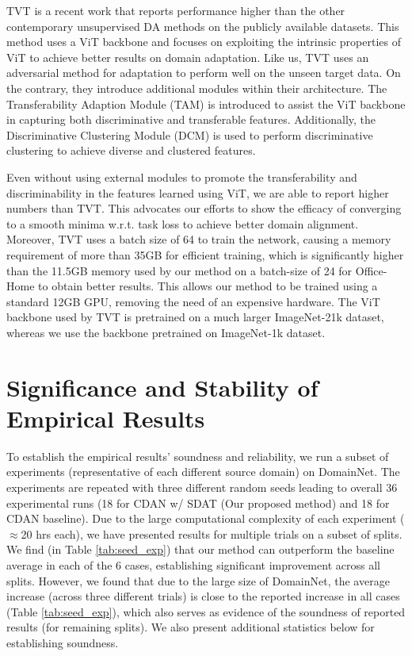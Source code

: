 \documentclass[table,dvipsnames]{article}
\theoremstyle{plain}
\theoremstyle{definition}
\theoremstyle{remark}
\begin{document}
TVT \cite{yang2021tvt} is a recent work that reports performance higher than the other contemporary unsupervised DA methods on the publicly available datasets. This method uses a ViT backbone and focuses on exploiting the intrinsic properties of ViT to achieve better results on domain adaptation. 
Like us, TVT uses an adversarial method for adaptation to perform well on the unseen target data. On the contrary, they introduce additional modules within their architecture. The Transferability Adaption Module (TAM) is introduced to assist the ViT backbone in capturing both discriminative and transferable features. Additionally, the Discriminative Clustering Module (DCM) is used to perform discriminative clustering to achieve diverse and clustered features. 

Even without using external modules to promote the transferability and discriminability in the features learned using ViT, we are able to report higher numbers than TVT. This advocates our efforts to show the efficacy of converging to a smooth minima w.r.t. task loss to achieve better domain alignment. Moreover, TVT uses a batch size of 64 to train the network, causing a memory requirement of more than 35GB for efficient training, which is significantly higher than the 11.5GB memory used by our method on a batch-size of 24 for Office-Home to obtain better results. This allows our method to be trained using a standard 12GB GPU, removing the need of an expensive hardware. The ViT backbone used by TVT is pretrained on a much larger ImageNet-21k dataset, whereas we use the backbone pretrained on ImageNet-1k dataset.   

\section{
{Significance and Stability of Empirical Results}}
\label{app:stats_sig}
To establish the empirical results' soundness and reliability, we run a subset of experiments (representative of each different source domain) on DomainNet. The experiments are repeated with three different random seeds leading to overall 36 experimental runs (18 for CDAN w/ SDAT (Our proposed method) and 18 for CDAN baseline). 
Due to the large computational complexity of each experiment ($\approx$20 hrs each), we have presented results for multiple trials on a subset of splits. We find (in Table \ref{tab:seed_exp}) that our method can outperform the baseline average in each of the 6 cases, establishing significant improvement across all splits. However, we found that due to the large size of DomainNet, the average increase (across three different trials) is close to the reported increase in all cases (Table \ref{tab:seed_exp}), which also serves as evidence of the soundness of reported results (for remaining splits). We also present additional statistics below for establishing soundness.
\end{document}

